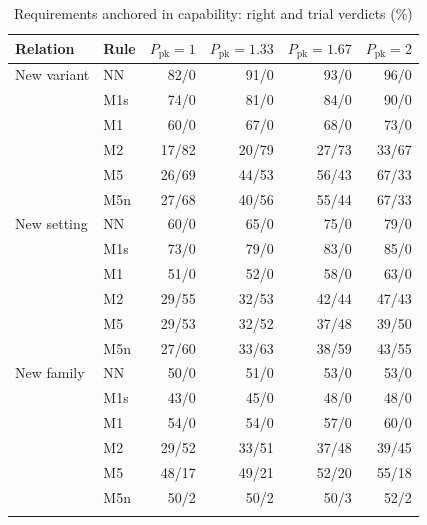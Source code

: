 \documentclass[pdflatex,sn-basic]{sn-jnl}
\newcommand{\tabsize}{\fontsize{8}{9.5}\selectfont}
\begin{document}
\begin{table}[tbp]
\tabsize
\setlength{\tabcolsep}{6pt}
\caption{Requirements anchored in capability: right and trial verdicts (\%)}\label{tab:capability}
\begin{tabular}{@{}llrrrr@{}}
\toprule
Relation & Rule & $P_\mathrm{pk}=1$ & $P_\mathrm{pk}=1.33$ & $P_\mathrm{pk}=1.67$ & $P_\mathrm{pk}=2$ \\
\midrule
New variant & NN & 82/0 & 91/0 & 93/0 & 96/0 \\
 & M1s & 74/0 & 81/0 & 84/0 & 90/0 \\
 & M1 & 60/0 & 67/0 & 68/0 & 73/0 \\
 & M2 & 17/82 & 20/79 & 27/73 & 33/67 \\
 & M5 & 26/69 & 44/53 & 56/43 & 67/33 \\
 & M5n & 27/68 & 40/56 & 55/44 & 67/33 \\
New setting & NN & 60/0 & 65/0 & 75/0 & 79/0 \\
 & M1s & 73/0 & 79/0 & 83/0 & 85/0 \\
 & M1 & 51/0 & 52/0 & 58/0 & 63/0 \\
 & M2 & 29/55 & 32/53 & 42/44 & 47/43 \\
 & M5 & 29/53 & 32/52 & 37/48 & 39/50 \\
 & M5n & 27/60 & 33/63 & 38/59 & 43/55 \\
New family & NN & 50/0 & 51/0 & 53/0 & 53/0 \\
 & M1s & 43/0 & 45/0 & 48/0 & 48/0 \\
 & M1 & 54/0 & 54/0 & 57/0 & 60/0 \\
 & M2 & 29/52 & 33/51 & 37/48 & 39/45 \\
 & M5 & 48/17 & 49/21 & 52/20 & 55/18 \\
 & M5n & 50/2 & 50/2 & 50/3 & 52/2 \\
\botrule
\end{tabular}
\end{table}
\end{document}
